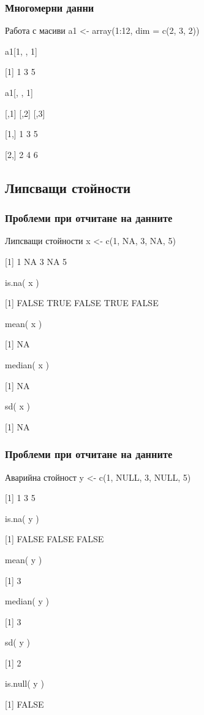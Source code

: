 \documentclass{beamer}
\begin{document}
\begin{frame}
\frametitle{Многомерни данни}
\begin{block}{Работа с масиви}
a1 <- array(1:12, dim = c(2, 3, 2))

a1[1, , 1]

[1] 1 3 5
 
a1[, , 1]

     [,1] [,2] [,3]

[1,]    1    3    5

[2,]    2    4    6
\end{block}
\end{frame}

\subsection{Липсващи стойности}

\begin{frame}[shrink]
\frametitle{Проблеми при отчитане на данните}
\begin{block}{Липсващи стойности}
x <- c(1, NA, 3, NA, 5)

[1]  1 NA  3 NA  5

is.na( x )

[1] FALSE  TRUE FALSE  TRUE FALSE

mean( x )

[1] NA

median( x )

[1] NA

sd( x )

[1] NA
\end{block}
\end{frame}

\begin{frame}
\frametitle{Проблеми при отчитане на данните}
\begin{block}{Аварийна стойност}
y <- c(1, NULL, 3, NULL, 5)

[1] 1 3 5

is.na( y )

[1] FALSE FALSE FALSE

mean( y )

[1] 3

median( y )

[1] 3

sd( y )

[1] 2

is.null( y )

[1] FALSE
\end{block}
\end{frame}
\end{document}
